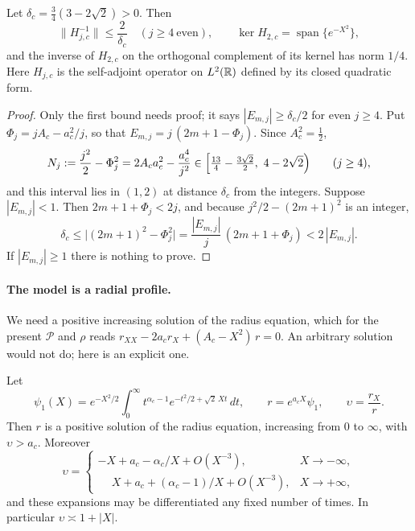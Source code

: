 \begin{lemma}\label{lem:central-gap}
Let $\delta_c=\tfrac34(3-2\sqrt2)>0$. Then
\begin{equation}\label{eq:rad-eq-sc3}
 \|H_{j,c}^{-1}\|\le\frac2{\delta_c}\quad(j\ge4\ \text{even}),
 \qquad \ker H_{2,c}=\operatorname{span}\{e^{-X^2}\},
\end{equation}
and the inverse of $H_{2,c}$ on the orthogonal complement of its
kernel has norm $1/4$. Here $H_{j,c}$ is the self-adjoint operator on
$L^2(\mathbb R)$ defined by its closed quadratic form.
\end{lemma}

\begin{proof}
Only the first bound needs proof; it says $|E_{m,j}|\ge\delta_c/2$ for
even $j\ge4$. Put $\Phi_j=jA_c-a_c^2/j$, so that
$E_{m,j}=j\,(2m+1-\Phi_j)$. Since $A_c^2=\tfrac12$,
\[
 N_j:=\frac{j^2}2-\Phi_j^2=2A_ca_c^2-\frac{a_c^4}{j^2}
 \in\Bigl[\tfrac{13}4-\tfrac{3\sqrt2}2,\ 4-2\sqrt2\Bigr)
 \qquad(j\ge4),
\]
and this interval lies in $(1,2)$ at distance $\delta_c$ from the
integers. Suppose $|E_{m,j}|<1$. Then $2m+1+\Phi_j<2j$, and because
$j^2/2-(2m+1)^2$ is an integer,
\[
 \delta_c\le\bigl|(2m+1)^2-\Phi_j^2\bigr|
 =\frac{|E_{m,j}|}{j}\,(2m+1+\Phi_j)<2\,|E_{m,j}| .
\]
If $|E_{m,j}|\ge1$ there is nothing to prove.
\end{proof}

\paragraph{The model is a radial profile.}
We need a positive increasing solution of the radius equation, which
for the present $\mathcal P$ and $\rho$ reads
$r_{XX}-2a_cr_X+(A_c-X^2)\,r=0$. An arbitrary solution would not do;
here is an explicit one.

\begin{lemma}\label{lem:central-radius}
Let
\begin{equation}\label{eq:rad-eq-sc6}
 \psi_1(X)=e^{-X^2/2}\int_0^\infty
 t^{\alpha_c-1}e^{-t^2/2+\sqrt2\,Xt}\,dt,
 \qquad r=e^{a_cX}\psi_1,\qquad \upsilon=\frac{r_X}r .
\end{equation}
Then $r$ is a positive solution of the radius equation, increasing
from $0$ to $\infty$, with $\upsilon>a_c$. Moreover
\begin{equation}\label{eq:rad-eq-sc6a}
 \upsilon=
 \begin{cases}
 -X+a_c-\alpha_c/X+O(X^{-3}),&X\to-\infty,\\[2pt]
 \phantom{-}X+a_c+(\alpha_c-1)/X+O(X^{-3}),&X\to+\infty,
 \end{cases}
\end{equation}
and these expansions may be differentiated any fixed number of times.
In particular $\upsilon\asymp1+|X|$.
\end{lemma}

